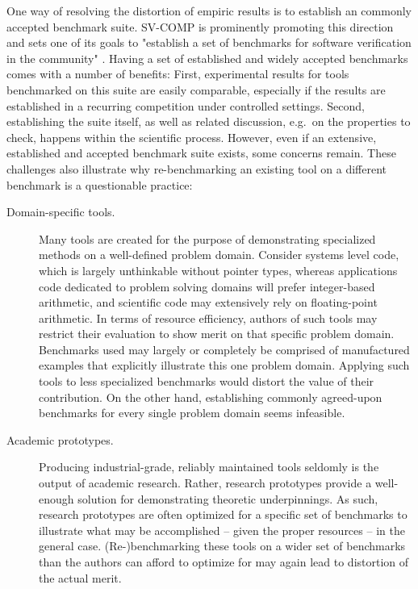 One way of resolving the distortion of empiric results is to establish an commonly accepted benchmark suite. SV-COMP is prominently promoting this direction and sets one of its goals to "establish a set of benchmarks for software verification in the community" \cite{DBLP:conf/tacas/Beyer12,DBLP:conf/tacas/Beyer13}. Having a set of established and widely accepted benchmarks comes with a number of benefits: First, experimental results for tools benchmarked on this suite are easily comparable, especially if the results are established in a recurring competition under controlled settings. Second, establishing the suite itself, as well as related discussion, e.g.\ on the properties to check, happens within the scientific process. However, even if an extensive, established and accepted benchmark suite exists, some concerns remain. These challenges also illustrate why re-benchmarking an existing tool on a different benchmark is a questionable practice:

\begin{description}
    \item[Domain-specific tools.] Many tools are created for the purpose of demonstrating specialized methods on a well-defined problem domain. Consider systems level code, which is largely unthinkable without pointer types, whereas applications code dedicated to problem solving domains will prefer integer-based arithmetic, and scientific code may extensively rely on floating-point arithmetic. In terms of resource efficiency, authors of such tools may restrict their evaluation to show merit on that specific problem domain. Benchmarks used may largely or completely be comprised of manufactured examples that explicitly illustrate this one problem domain. Applying such tools to less specialized benchmarks would distort the value of their contribution. On the other hand, establishing commonly agreed-upon benchmarks for every single problem domain seems infeasible.
    \item[Academic prototypes.] Producing industrial-grade, reliably maintained tools seldomly is the output of academic research. Rather, research prototypes provide a well-enough solution for demonstrating theoretic underpinnings. As such, research prototypes are often optimized for a specific set of benchmarks to illustrate what may be accomplished -- given the proper resources -- in the general case. (Re-)benchmarking these tools on a wider set of benchmarks than the authors can afford to optimize for may again lead to distortion of the actual merit.
\end{description}

